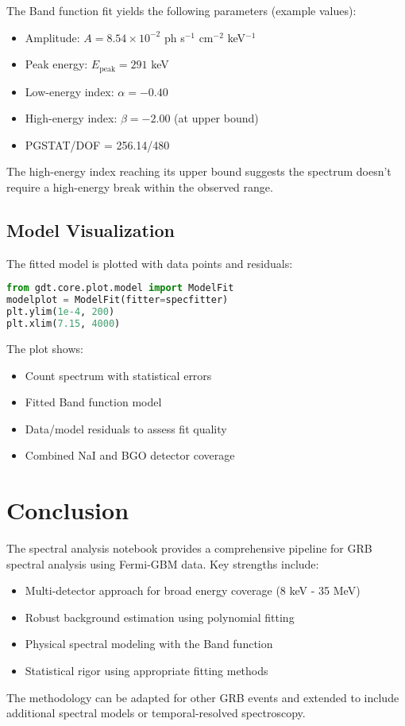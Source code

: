 \documentclass{article}
\begin{document}
The Band function fit yields the following parameters (example values):
\begin{itemize}
    \item Amplitude: $A = 8.54 \times 10^{-2}$ ph s$^{-1}$ cm$^{-2}$ keV$^{-1}$
    \item Peak energy: $E_{\text{peak}} = 291$ keV
    \item Low-energy index: $\alpha = -0.40$
    \item High-energy index: $\beta = -2.00$ (at upper bound)
    \item PGSTAT/DOF = 256.14/480
\end{itemize}

The high-energy index reaching its upper bound suggests the spectrum doesn't require a high-energy break within the observed range.

\subsection{Model Visualization}

The fitted model is plotted with data points and residuals:

\begin{lstlisting}[language=Python]
from gdt.core.plot.model import ModelFit
modelplot = ModelFit(fitter=specfitter)
plt.ylim(1e-4, 200)
plt.xlim(7.15, 4000)
\end{lstlisting}

The plot shows:
\begin{itemize}
    \item Count spectrum with statistical errors
    \item Fitted Band function model
    \item Data/model residuals to assess fit quality
    \item Combined NaI and BGO detector coverage
\end{itemize}

\section{Conclusion}

The spectral analysis notebook provides a comprehensive pipeline for GRB spectral analysis using Fermi-GBM data. Key strengths include:

\begin{itemize}
    \item Multi-detector approach for broad energy coverage (8 keV - 35 MeV)
    \item Robust background estimation using polynomial fitting
    \item Physical spectral modeling with the Band function
    \item Statistical rigor using appropriate fitting methods
\end{itemize}

The methodology can be adapted for other GRB events and extended to include additional spectral models or temporal-resolved spectroscopy.
\end{document}
